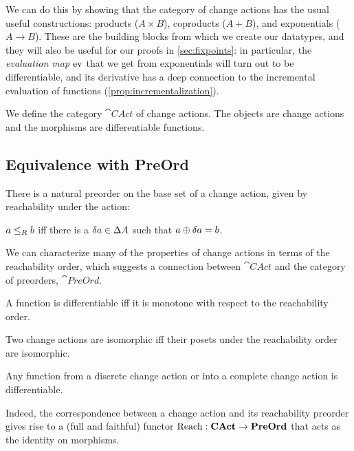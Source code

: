 We can do this by showing that the category of change actions has the usual
useful constructions: products ($A \times B$), coproducts ($A + B$), and
exponentials ($A \rightarrow B$). These are the
building blocks from which we create our datatypes, and they will also be useful
for our proofs in \cref{sec:fixpoints}: in particular, the \emph{evaluation map}
$\operatorname{ev}$ that we get from exponentials will turn out to be differentiable, and its
derivative has a deep connection to the incremental evaluation of functions (\cref{prop:incrementalization}).

\begin{defn}
  We define the category $\cat{CAct}$ of change actions. The objects are
  change actions and the morphisms are differentiable functions. 
\end{defn}

\subsection{Equivalence with PreOrd}

There is a natural preorder on the base set of a change action, given by reachability
under the action:

\begin{defn}
  $a \leq_R b$ iff there is a $\delta a \in \Delta A$ such that $a \oplus
  \delta a = b$.
\end{defn}

We can characterize many of the properties of change actions in terms of the reachability order,
which suggests a connection between $\cat{CAct}$ and the category of preorders, $\cat{PreOrd}$.

\begin{prop}
  A function is differentiable iff it is monotone with respect to the
  reachability order. 
\end{prop}

\begin{corollary}
  Two change actions are isomorphic iff their posets under the reachability
  order are isomorphic.
\end{corollary}

\begin{corollary}
  Any function from a discrete change action or into a complete change
  action is differentiable.
\end{corollary}

Indeed, the correspondence between a change action and its reachability preorder gives rise to
a (full and faithful) functor $\operatorname{Reach} : \mathbf{CAct} \rightarrow \mathbf{PreOrd}$ that acts as the
identity on morphisms.


